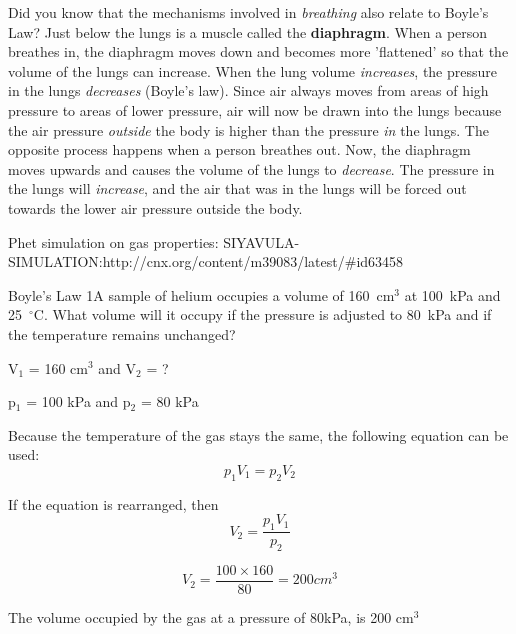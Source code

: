 \begin{IFact}{
Did you know that the mechanisms involved in \textit{breathing} also relate to Boyle's Law? Just below the lungs is a muscle called the \textbf{diaphragm}. When a person breathes in, the diaphragm moves down and becomes more 'flattened' so that the volume of the lungs can increase. When the lung volume \textit{increases}, the pressure in the lungs \textit{decreases} (Boyle's law). Since air always moves from areas of high pressure to areas of lower pressure, air will now be drawn into the lungs because the air pressure \textit{outside} the body is higher than the pressure \textit{in} the lungs. The opposite process happens when a person breathes out. Now, the diaphragm moves upwards and causes the volume of the lungs to \textit{decrease}. The pressure in the lungs will \textit{increase}, and the air that was in the lungs will be forced out towards the lower air pressure outside the body.
}
\end{IFact}
Phet simulation on gas properties: SIYAVULA-SIMULATION:http://cnx.org/content/m39083/latest/#id63458
\begin{wex}{Boyle's Law 1}{A sample of helium occupies a volume of 160~$\mathrm{cm}^3$ at 100~kPa and 25~$^\circ$C. What volume will it occupy if the pressure is adjusted to 80~kPa and if the temperature remains unchanged?\\}
{
V$_{1}$ = 160 cm$^{3}$ and V$_{2}$ = ?

p$_{1}$ = 100 kPa and p$_{2}$ = 80 kPa\\
}
{

Because the temperature of the gas stays the same, the following equation can be used: 
\begin{equation*}
p_{1}V_{1} = p_{2}V_{2}
\end{equation*}

If the equation is rearranged, then
\begin{equation*}
V_{2} = \frac{p_{1}V_{1}}{p_{2}} 
\end{equation*}
}

{
\begin{equation*}
V_{2} = \frac{100 \times 160}{80}
= 200 cm^{3}
\end{equation*}

The volume occupied by the gas at a pressure of 80kPa, is 200 cm$^{3}$
}

\end{wex}


